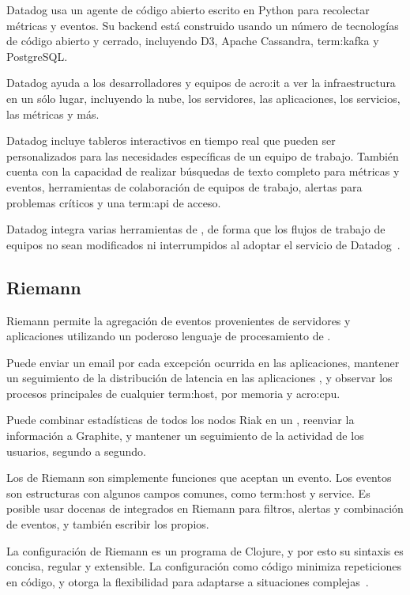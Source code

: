 Datadog usa un agente de código abierto escrito en Python para recolectar
métricas y eventos. Su backend está construido usando un número de tecnologías
de código abierto y cerrado, incluyendo D3, Apache Cassandra, \gls{term:kafka} y
PostgreSQL.

Datadog ayuda a los desarrolladores y equipos de \gls{acro:it} a ver la
infraestructura en un sólo lugar, incluyendo la nube, los servidores, las
aplicaciones, los servicios, las métricas y más.

Datadog incluye tableros interactivos en tiempo real que pueden ser
personalizados para las necesidades específicas de un equipo de trabajo. También
cuenta con la capacidad de realizar búsquedas de texto completo para métricas y eventos, herramientas de colaboración de equipos de trabajo, alertas para problemas críticos y una \gls{term:api} de acceso.

Datadog integra varias herramientas de , de forma que los flujos
de trabajo de equipos no sean modificados ni interrumpidos al adoptar el
servicio de Datadog~\cite{datadog}.

\subsection{Riemann}

Riemann permite la agregación de eventos provenientes de servidores y
aplicaciones utilizando un poderoso lenguaje de procesamiento de
.

Puede enviar un email por cada excepción ocurrida en las aplicaciones, mantener
un seguimiento de la distribución de latencia en las aplicaciones , y
observar los procesos principales de cualquier \gls{term:host}, por memoria y
\gls{acro:cpu}.

Puede combinar estadísticas de todos los nodos Riak en un ,
reenviar la información a Graphite, y mantener un seguimiento de la actividad de
los usuarios, segundo a segundo.

Los  de Riemann son simplemente funciones que aceptan un evento.
Los eventos son estructuras con algunos campos comunes, como \gls{term:host} y
service. Es posible usar docenas de  integrados en Riemann para
filtros, alertas y combinación de eventos, y también escribir los propios.

La configuración de Riemann es un programa de Clojure, y por esto su sintaxis
es concisa, regular y extensible. La configuración como código minimiza
repeticiones en código, y otorga la flexibilidad para adaptarse a situaciones
complejas~\cite{riemann}.
